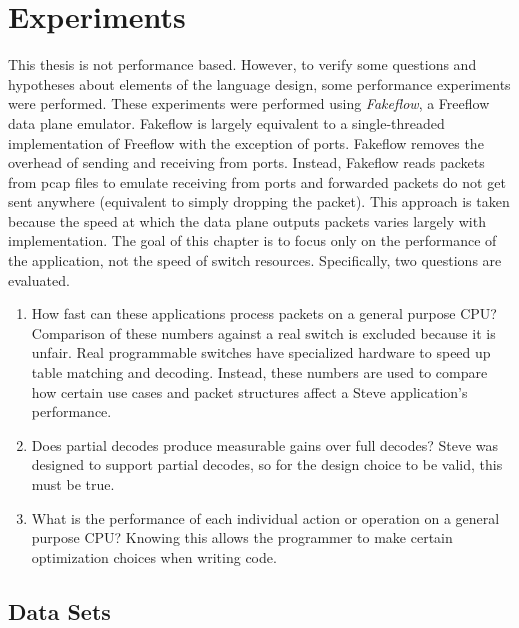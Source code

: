 \chapter{Experiments} \label{ch:experiments}


This thesis is not performance based. However, to verify some questions and hypotheses about elements of the language design, some performance experiments were performed.
These experiments were performed using \textit{Fakeflow}, a Freeflow data plane emulator. Fakeflow is largely equivalent to a single-threaded implementation of Freeflow with the exception of ports. Fakeflow removes the overhead of sending and receiving from ports. Instead, Fakeflow reads packets from pcap files to emulate receiving from ports and forwarded packets do not get sent anywhere (equivalent to simply dropping the packet). This approach is taken because the speed at which the data plane outputs packets varies largely with implementation. The goal of this chapter is to focus only on the performance of the application, not the speed of switch resources.
Specifically, two questions are evaluated.

\begin{enumerate}
\item How fast can these applications process packets on a general purpose CPU? Comparison of these numbers against a real switch is excluded because it is unfair. Real programmable switches have specialized hardware to speed up table matching and decoding. Instead, these numbers are used to compare how certain use cases and packet structures affect a Steve application's performance.

\item Does partial decodes produce measurable gains over full decodes? Steve was designed to support partial decodes, so for the design choice to be valid, this must be true.

\item What is the performance of each individual action or operation on a general purpose CPU? Knowing this allows the programmer to make certain optimization choices when writing code.
\end{enumerate}

\section{Data Sets} \label{exp:use_cases}

